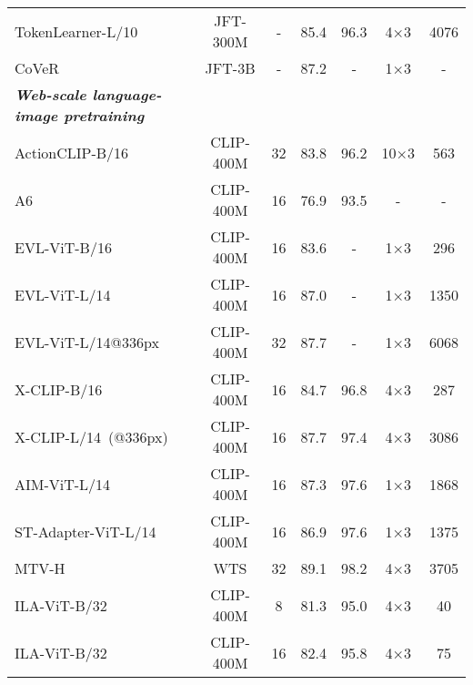 \documentclass[10pt,twocolumn,letterpaper]{article}
\begin{document}
\begin{table*}[t!]
\begin{center}
{\begin{tabular}{lcccccc}
TokenLearner-L/10~\cite{b27}                                      & JFT-300M  & -      & 85.4          & 96.3          & 4×3   & 4076     \\
CoVeR~\cite{b49}                                                 & JFT-3B  & -      & 87.2          & -             & 1×3   & -        \\ \midrule
\textit{\textbf{Web-scale language-image pretraining}} &           &        &               &               &       &          \\
ActionCLIP-B/16~\cite{b22}                                        & CLIP-400M & 32     & 83.8          & 96.2          & 10×3  & 563      \\
A6~\cite{b23}                                                     & CLIP-400M & 16     & 76.9          & 93.5          & -     & -        \\
EVL-ViT-B/16~\cite{b25}                                          & CLIP-400M & 16     & 83.6          & -             & 1×3   & 296      \\
EVL-ViT-L/14~\cite{b25}                                          & CLIP-400M & 16     & 87.0          & -             & 1×3   & 1350     \\
EVL-ViT-L/14@336px~\cite{b25}                                    & CLIP-400M & 32     & 87.7          & -             & 1×3   & 6068     \\
X-CLIP-B/16~\cite{b24}                                            & CLIP-400M & 16     & 84.7          & 96.8          & 4×3   & 287      \\
X-CLIP-L/14~(@336px)~\cite{b24}                                    & CLIP-400M & 16     & 87.7          & 97.4          & 4×3   & 3086     \\
AIM-ViT-L/14~\cite{yang2023aim}                                           & CLIP-400M & 16     & 87.3          & 97.6          & 1×3   & 1868     \\
ST-Adapter-ViT-L/14~\cite{pan2022st}                                    & CLIP-400M & 16     & 86.9          & 97.6          & 1×3   & 1375     \\
MTV-H~\cite{b34}                                                  & WTS       & 32     & {89.1} & {98.2} & 4×3   & 3705     \\ \midrule
ILA-ViT-B/32                                          & CLIP-400M & 8      & 81.3          & 95.0          & 4×3   & 40       \\
ILA-ViT-B/32                                    & CLIP-400M & 16     & 82.4          & 95.8          & 4×3   & 75       \\

\end{tabular}}
\end{center}
\end{table*}
\end{document}
